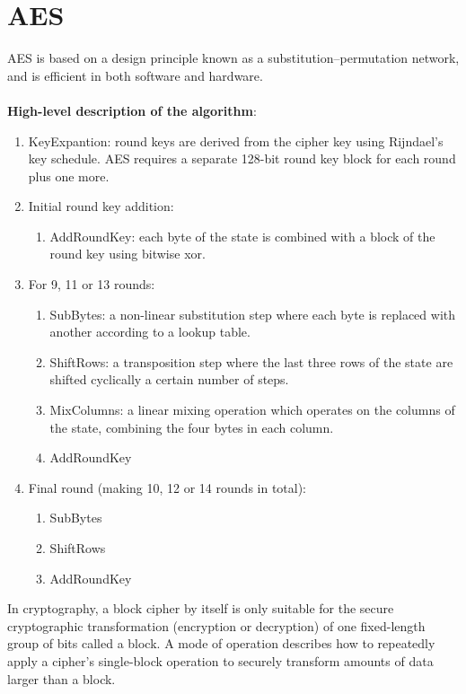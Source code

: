\section{AES} \label{sec:AES}
AES is based on a design principle known as a substitution–permutation network, and is efficient in both software and hardware.
\\
\\
\textbf{High-level description of the algorithm}:
\begin{enumerate}
	\item KeyExpantion: round keys are derived from the cipher key using Rijndael's key schedule. AES requires a separate 128-bit round key block for each round plus one more.
	\item Initial round key addition:
		\begin{enumerate}
			\item AddRoundKey: each byte of the state is combined with a block of the round key using bitwise xor.
		\end{enumerate}
	\item For 9, 11 or 13 rounds:
		\begin{enumerate}
			\item SubBytes: a non-linear substitution step where each byte is replaced with another according to a lookup table.
			\item ShiftRows: a transposition step where the last three rows of the state are shifted cyclically a certain number of steps.
			\item MixColumns: a linear mixing operation which operates on the columns of the state, combining the four bytes in each column.
			\item AddRoundKey
		\end{enumerate}
	\item Final round (making 10, 12 or 14 rounds in total):
		\begin{enumerate}
			\item SubBytes
			\item ShiftRows
			\item AddRoundKey
		\end{enumerate}
\end{enumerate}


In cryptography, a block cipher by itself is only suitable for the secure cryptographic transformation (encryption or decryption) of one fixed-length group of bits called a block. A mode of operation describes how to repeatedly apply a cipher's single-block operation to securely transform amounts of data larger than a block.
